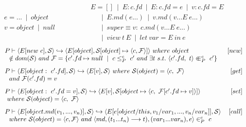 \documentclass[tese,capa,english]{texufpel}
\begin{document}
\begin{figure}[t]
\[
\begin{array}{ll} 
\hspace{140pt} \  
&
E = [] \ \mid \ E: c.fd \ \mid \ E: c.fd = e \ \mid \ v: c.fd = E 
\\
e = ... \ \mid \ object
&
\hspace{16pt} \mid \ E.md(e ...) \ \mid \ v.md(v ... E \ e ...)
\\
v = object \ \mid \ null
&
\hspace{16pt} \mid \ super \equiv v: \ c.md(v ... E \ e ...)
\\
&
\hspace{16pt} \mid \ view \ t \ E \ \mid \ let \ var = E \ in \ e
\end{array}
\]
\vspace{10pt}
\[
\begin{array}{lr} 
P \vdash \langle E[new \ c], \mathcal{S} \rangle \hookrightarrow \langle E[object], \mathcal{S}[object] \mapsto \langle c, \mathcal{F} \rangle ] \rangle \ where \ object
&
[new]
\\
\ \ \notin dom(\mathcal{S}) \ and \ \mathcal{F} = \{c'.fd \mapsto null \ \mid \ c \le^{c}_{P} \ c' \ and \ \exists t \ s.t. \ \langle c'.fd, \ t \rangle \Inn^{c}_{P} \ c' \}
&
\vspace{8pt}
\\ 
P \vdash \langle E[object: \ c'.fd], \mathcal{S} \rangle \hookrightarrow \langle E[v], \mathcal{S} \rangle \ where \ \mathcal{S}(object) = \langle c, \ \mathcal{F} \rangle
&
[get]
\\
\ \ and \ \mathcal{F}(c'.fd) = v
&
\vspace{8pt}
\\
P \vdash \langle E[object: \ c'.fd = v], \mathcal{S} \rangle \hookrightarrow \langle E[v], \mathcal{S}[object \mapsto \langle c, \ \mathcal{F} [c'.fd \mapsto v] \rangle ] \rangle 
&
[set]
\\
\ where \ \mathcal{S}(object) = \langle c, \ \mathcal{F} \rangle
&
\vspace{8pt}
\\
P \vdash \langle E[object.md(v_1,...,v_n)], \mathcal{S} \rangle \hookrightarrow \langle E[e[object/this,v_1/var_1,...,v_n/var_n]], \mathcal{S} \rangle
&
[call]
\\
\ \ where \ \mathcal{S}(object) = \langle c, \mathcal{F} \rangle \ and \ \langle md, (t_1...t_n) --> t), (var_1...var_n), e \rangle \in^{c}_{P} \ c
&
\vspace{8pt}
\\

\end{array}\]
\end{figure}
\end{document}
